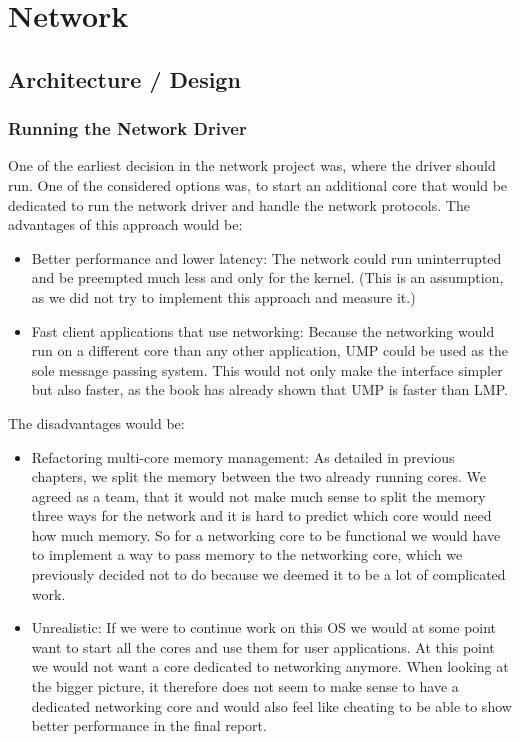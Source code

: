 \chapter{Network}

\section{Architecture / Design}

\subsection{Running the Network Driver}

One of the earliest decision in the network project was, where the driver should run. One of the considered options was, to start an additional core that would be dedicated to run the network driver and handle the network protocols. The advantages of this approach would be:
\begin{itemize}
    \item Better performance and lower latency: The network could run uninterrupted and be preempted much less and only for the kernel. (This is an assumption, as we did not try to implement this approach and measure it.)
    \item Fast client applications that use networking: Because the networking would run on a different core than any other application, UMP could be used as the sole message passing system. This would not only make the interface simpler but also faster, as the book has already shown that UMP is faster than LMP.
\end{itemize}
The disadvantages would be:
\begin{itemize}
    \item Refactoring multi-core memory management: As detailed in previous chapters, we split the memory between the two already running cores. We agreed as a team, that it would not make much sense to split the memory three ways for the network and it is hard to predict which core would need how much memory. So for a networking core to be functional we would have to implement a way to pass memory to the networking core, which we previously decided not to do because we deemed it to be a lot of complicated work.
    \item Unrealistic: If we were to continue work on this OS we would at some point want to start all the cores and use them for user applications. At this point we would not want a core dedicated to networking anymore. When looking at the bigger picture, it therefore does not seem to make sense to have a dedicated networking core and would also feel like cheating to be able to show better performance in the final report.
\end{itemize}

